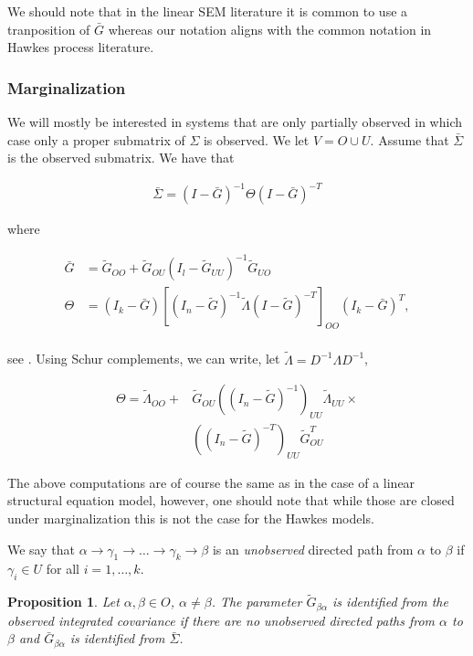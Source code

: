 \documentclass[accepted]{uai2021} %
\newtheorem{prop}[thm]{Proposition}
\begin{document}
We should note that in the linear SEM literature it is common to use a 
tranposition of $\bar{G}$ whereas our notation aligns with the common notation 
in Hawkes process literature.


\subsubsection{Marginalization}

We will mostly be interested in systems that are only partially observed in 
which case only a proper submatrix of $\Sigma$ is observed. We let $V = O \cup 
U$. Assume that $\bar{\Sigma}$ is the observed submatrix. We have 
that 

\begin{align}
\bar{\Sigma} = (I - \bar{G})^{-1}\Theta(I - \bar{G})^{-T}
\end{align}

where 

\begin{align*}
\bar{G} & = \tilde{G}_{OO} +  \tilde{G}_{OU}(I_l - 
\tilde{G}_{UU})^{-1}\tilde{G}_{UO} \\
\Theta & = (I_k-\bar{G})[(I_n - \tilde{G})^{-1}\tilde{\Lambda}(I - 
\tilde{G})^{-T}]_{OO}(I_k-\bar{G})^T, \\
\end{align*}

see \cite{hyttinen2012}. Using Schur complements, we can write, let 
$\tilde{\Lambda} 
= D^{-1}\Lambda D^{-1}$,

\begin{align*}
	\Theta =  \tilde{\Lambda}_{OO} + & \tilde{G}_{OU}((I_n - 
	\tilde{G})^{-1})_{UU}\tilde{\Lambda}_{UU} \times  \\ & ((I_n - 
	\tilde{G})^{-T})_{UU}
	\tilde{G}_{OU}^T
\end{align*}

The above computations are of course the same as in the case of a linear 
structural equation model, however, one should note that while those are closed 
under marginalization this is not the case for the Hawkes models.

We say that $\alpha \rightarrow \gamma_1 \rightarrow \ldots \rightarrow 
\gamma_k \rightarrow \beta$ is an \emph{unobserved} directed path from $\alpha$ 
to $\beta$ if $\gamma_i \in U$ for all $i = 1,\ldots, k$. 

\begin{prop}
	Let $\alpha,\beta \in O$, $\alpha\neq \beta$. The parameter 
	$\tilde{G}_{\beta\alpha}$ is 
	identified 
	from the observed integrated covariance if there 
	are no unobserved directed paths from 
	$\alpha$ to $\beta$ and $\bar{G}_{\beta\alpha}$ is identified from 
	$\bar{\Sigma}$.
\end{prop}
\end{document}
